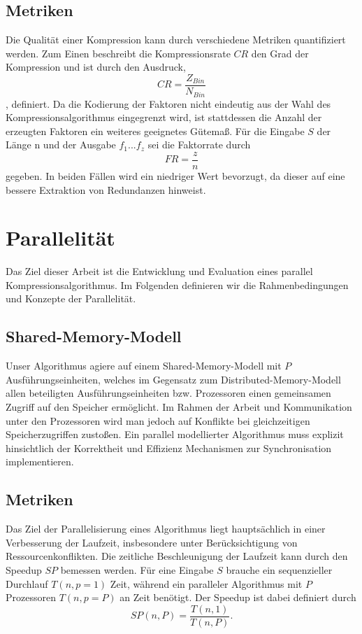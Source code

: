 \subsection{Metriken}
Die Qualität einer Kompression kann durch verschiedene Metriken quantifiziert werden. Zum Einen beschreibt die Kompressionsrate $CR$ den Grad der Kompression und ist durch den
Ausdruck, 
\begin{equation}
    CR = \frac{Z_{Bin}}{N_{Bin}}
\end{equation}
, definiert.
Da die Kodierung der Faktoren nicht eindeutig aus der Wahl des Kompressionsalgorithmus eingegrenzt wird, ist stattdessen die Anzahl der erzeugten Faktoren ein
weiteres geeignetes Gütemaß. Für die Eingabe $S$ der Länge n und der Ausgabe $f_1...f_z$ sei die Faktorrate durch
\begin{equation}
    FR = \frac{z}{n}
\end{equation}
gegeben. In beiden Fällen wird ein niedriger Wert bevorzugt, da dieser auf eine bessere Extraktion von Redundanzen hinweist.

\section{Parallelität}
Das Ziel dieser Arbeit ist die Entwicklung und Evaluation eines parallel Kompressionsalgorithmus. Im Folgenden definieren wir die Rahmenbedingungen und Konzepte der Parallelität.

\subsection{Shared-Memory-Modell}
Unser Algorithmus agiere auf einem Shared-Memory-Modell mit $P$ Ausführungseinheiten, welches im Gegensatz zum Distributed-Memory-Modell allen beteiligten Ausführungseinheiten bzw. 
Prozessoren einen gemeinsamen Zugriff auf den Speicher ermöglicht. Im Rahmen der Arbeit und Kommunikation unter den Prozessoren wird man jedoch auf Konflikte bei gleichzeitigen 
Speicherzugriffen zustoßen. Ein parallel modellierter Algorithmus muss explizit hinsichtlich der Korrektheit und Effizienz Mechanismen zur Synchronisation implementieren.

\subsection{Metriken}
Das Ziel der Parallelisierung eines Algorithmus liegt hauptsächlich in einer Verbesserung der Laufzeit, insbesondere unter Berücksichtigung von Ressourcenkonflikten. Die zeitliche
Beschleunigung der Laufzeit kann durch den Speedup $SP$ bemessen werden. Für eine Eingabe $S$ brauche ein sequenzieller Durchlauf $T(n, p=1)$ Zeit, während ein paralleler
Algorithmus mit $P$ Prozessoren $T(n,p=P)$ an Zeit benötigt. Der Speedup ist dabei definiert durch
\begin{equation}
    SP(n,P) = \frac{T(n,1)}{T(n,P)}.
\end{equation}

